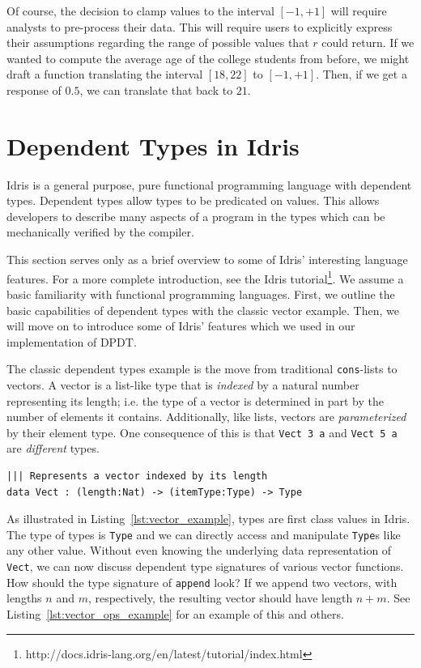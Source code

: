 \documentclass[12pt]{report}
\begin{document}
Of course, the decision to clamp values to the interval $[-1,+1]$ will require analysts to pre-process their data.
This will require users to explicitly express their assumptions regarding the range of possible values that $r$ could return.
If we wanted to compute the average age of the college students from before, we might draft a function translating the interval $[18,22]$ to $[-1,+1]$.
Then, if we get a response of $0.5$, we can translate that back to $21$.

\chapter{Dependent Types in Idris}\label{sec:dependent_types_in_idris}

Idris is a general purpose, pure functional programming language with dependent types.
Dependent types allow types to be predicated on values.
This allows developers to describe many aspects of a program in the types which can be mechanically verified by the compiler.

This section serves only as a brief overview to some of Idris' interesting language features.
For a more complete introduction, see the Idris tutorial\footnote{http://docs.idris-lang.org/en/latest/tutorial/index.html}.
We assume a basic familiarity with functional programming languages.
First, we outline the basic capabilities of dependent types with the classic vector example.
Then, we will move on to introduce some of Idris' features which we used in our implementation of DPDT.

The classic dependent types example is the move from traditional \texttt{cons}-lists to vectors.
A vector is a list-like type that is \textit{indexed} by a natural number representing its length; i.e. the type of a vector is determined in part by the number of elements it contains.
Additionally, like lists, vectors are \textit{parameterized} by their element type.
One consequence of this is that \texttt{Vect 3 a} and \texttt{Vect 5 a} are \textit{different} types.

\begin{lstlisting}[caption={Vector Example},label={lst:vector_example}]
||| Represents a vector indexed by its length
data Vect : (length:Nat) -> (itemType:Type) -> Type
\end{lstlisting}

As illustrated in Listing~\ref{lst:vector_example}, types are first class values in Idris.
The type of types is \texttt{Type} and we can directly access and manipulate \texttt{Type}s like any other value.
Without even knowing the underlying data representation of \texttt{Vect}, we can now discuss dependent type signatures of various vector functions.
How should the type signature of \texttt{append} look?
If we append two vectors, with lengths $n$ and $m$, respectively, the resulting vector should have length $n+m$.
See Listing~\ref{lst:vector_ops_example} for an example of this and others.
\end{document}
